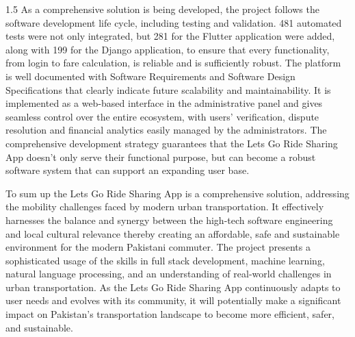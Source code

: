 \begin{spacing}{1.5}
As a comprehensive solution is being developed, the project follows the software development life cycle, including testing and validation. 481 automated tests were not only integrated, but 281 for the Flutter application were added, along with 199 for the Django application, to ensure that every functionality, from login to fare calculation, is reliable and is sufficiently robust. The platform is well documented with Software Requirements and Software Design Specifications that clearly indicate future scalability and maintainability. It is implemented as a web-based interface in the administrative panel and gives seamless control over the entire ecosystem, with users' verification, dispute resolution and financial analytics easily managed by the administrators. The comprehensive development strategy guarantees that the Lets Go Ride Sharing App doesn't only serve their functional purpose, but can become a robust software system that can support an expanding user base.

To sum up the Lets Go Ride Sharing App is a comprehensive solution, addressing the mobility challenges faced by modern urban transportation. It effectively harnesses the balance and synergy between the high-tech software engineering and local cultural relevance thereby creating an affordable, safe and sustainable environment for the modern Pakistani commuter. The project presents a sophisticated usage of the skills in full stack development, machine learning, natural language processing, and an understanding of real-world challenges in urban transportation. As the Lets Go Ride Sharing App continuously adapts to user needs and evolves with its community, it will potentially make a significant impact on Pakistan's transportation landscape to become more efficient, safer, and sustainable.

\end{spacing}
\newpage